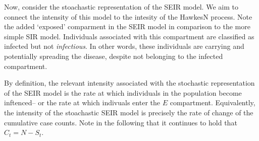 \documentclass[12pt]{article}
\newtheorem{theorem}{Theorem}
\begin{document}



  






Now, consider the stoachastic representation of the SEIR model. We aim to connect the intensity of this model to the intesity of the HawkesN process. Note the added `exposed' comparment in the SEIR model in comparison to the more simple SIR model. Individuals associated with this compartment are classified as infected but not \textit{infectious}. In other words, these individuals are carrying and potentially spreading the disease, despite not belonging to the infected compartment.

By definition, the relevant intensity associated with the stochastic representation of the SEIR model is the rate at which individuals in the population become inftenced– or the rate at which indivuals enter the $E$ compartment. Equivalently, the intensity of the stoachastic SEIR model is precisely the rate of change of the cumulative case counts. Note in the following that it continues to hold that $C_t = N - S_t$. 
\end{document}
